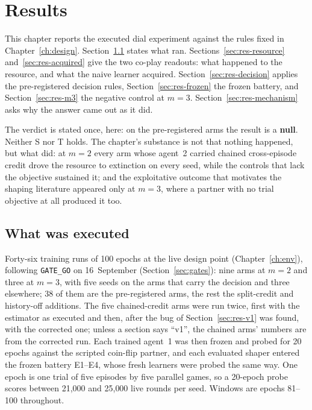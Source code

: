 \chapter{Results}
\label{ch:results}


This chapter reports the executed dial experiment against the rules fixed in
Chapter~\ref{ch:design}.
Section~\ref{sec:res-executed} states what ran.
Sections~\ref{sec:res-resource} and~\ref{sec:res-acquired} give the two
co-play readouts: what happened to the resource, and what the naive learner
acquired.
Section~\ref{sec:res-decision} applies the pre-registered decision rules,
Section~\ref{sec:res-frozen} the frozen battery, and
Section~\ref{sec:res-m3} the negative control at \(m=3\).
Section~\ref{sec:res-mechanism} asks why the answer came out as it did.

The verdict is stated once, here: on the pre-registered arms the result is a
\textbf{null}.
Neither S nor T holds.
The chapter's substance is not that nothing happened, but what did: at
\(m=2\) every arm whose agent~2 carried chained cross-episode credit drove the
resource to extinction on every seed, while the controls that lack the
objective sustained it; and the exploitative outcome that motivates the
shaping literature appeared only at \(m=3\), where a partner with no trial
objective at all produced it too.

\section{What was executed}
\label{sec:res-executed}

Forty-six training runs of 100 epochs at the live design point
(Chapter~\ref{ch:env}), following \texttt{GATE\_GO} on 16~September
(Section~\ref{sec:gates}): nine arms at \(m=2\) and three at \(m=3\), with
five seeds on the arms that carry the decision and three elsewhere; 38 of
them are the pre-registered arms, the rest the split-credit and history-off
additions.
The five chained-credit arms were run twice, first with the estimator as
executed and then, after the bug of Section~\ref{sec:res-v1} was found,
with the corrected one; unless a section says ``v1'', the chained arms'
numbers are from the corrected run.
Each trained agent~1 was then frozen and probed for 20 epochs against the
scripted coin-flip partner, and each evaluated shaper entered the frozen
battery E1--E4, whose fresh learners were probed the same way.
One epoch is one trial of five episodes by five parallel games, so a
20-epoch probe scores between 21{,}000 and 25{,}000 live rounds per seed.
Windows are epochs 81--100 throughout.

